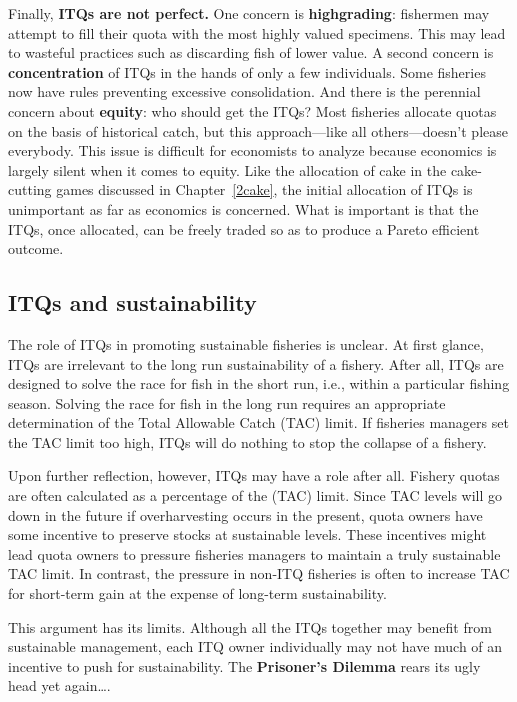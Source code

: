 Finally, \textbf{ITQs are not perfect.} One concern is \textbf{highgrading}: fishermen may attempt to fill their quota with the most highly valued specimens. This may lead to wasteful practices such as discarding fish of lower value. A second concern is \textbf{concentration} of ITQs in the hands of only a few individuals. Some fisheries now have rules preventing excessive consolidation. And there is the perennial concern about \textbf{equity}: who should get the ITQs? Most fisheries allocate quotas on the basis of historical catch, but this approach---like all others---doesn't please everybody. This issue is difficult for economists to analyze because economics is largely silent when it comes to equity. Like the allocation of cake in the cake-cutting games discussed in Chapter~\ref{2cake}, the initial allocation of ITQs is unimportant as far as economics is concerned. What is important is that the ITQs, once allocated, can be freely traded so as to produce a Pareto efficient outcome.


\subsection*{ITQs and sustainability}

The role of ITQs in promoting sustainable fisheries is unclear. At first glance, ITQs are irrelevant to the long run sustainability of a fishery. After all, ITQs are designed to solve the race for fish in the short run, i.e., within a particular fishing season. Solving the race for fish in the long run requires an appropriate determination of the Total Allowable Catch (TAC) limit. If fisheries managers set the TAC limit too high, ITQs will do nothing to stop the collapse of a fishery.

Upon further reflection, however, ITQs may have a role after all. Fishery quotas are often calculated as a percentage of the (TAC) limit. Since TAC levels will go down in the future if overharvesting occurs in the present, quota owners have some incentive to preserve stocks at sustainable levels. These incentives might lead quota owners to pressure fisheries managers to maintain a truly sustainable TAC limit. In contrast, the pressure in non-ITQ fisheries is often to increase TAC for short-term gain at the expense of long-term sustainability.

This argument has its limits. Although all the ITQs together may benefit from sustainable management, each ITQ owner individually may not have much of an incentive to push for sustainability. The \textbf{Prisoner's Dilemma} rears its ugly head yet again\ldots.




